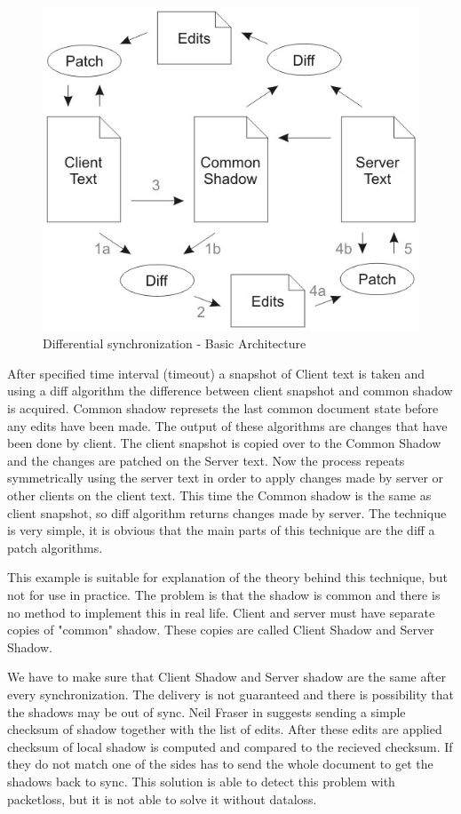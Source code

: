 \documentclass[12pt,oneside]{fithesis2}
\begin{document}
\begin{figure}[H]
\caption{Differential synchronization - Basic Architecture \cite{Fraser}}
\label{fig:ds1}
\centering
\vspace{5mm}
\includegraphics{diff1}
\end{figure}
After specified time interval (timeout) a snapshot of Client text is taken and using a diff algorithm the difference between client snapshot and common shadow is acquired. Common shadow represets the last common document state before any edits have been made. The output of these algorithms are changes that have been done by client. The client snapshot is copied over to the Common Shadow and the changes are patched on the Server text. Now the process repeats symmetrically using the server text in order to apply changes made by server or other clients on the client text. This time the Common shadow is the same as client snapshot, so diff algorithm returns changes made by server. The technique is very simple, it is obvious that the main parts of this technique are the diff a patch algorithms.
\par This example is suitable for explanation of the theory behind this technique, but not for use in practice. The problem is that the shadow is common and there is no method to implement this in real life. Client and server must have separate copies of "common" shadow. These copies are called Client Shadow and Server Shadow.
\par We have to make sure that Client Shadow and Server shadow are the same after every synchronization. The delivery is not guaranteed and there is possibility that the shadows may be out of sync. Neil Fraser in \cite{Fraser} suggests sending a simple checksum of shadow together with the list of edits. After these edits are applied checksum of local shadow is computed and compared to the recieved checksum. If they do not match one of the sides has to send the whole document to get the shadows back to sync. This solution is able to detect this problem with packetloss, but it is not able to solve it without dataloss.
\end{document}

